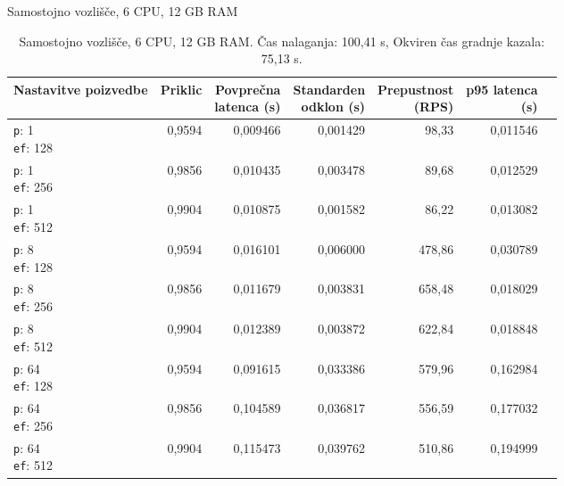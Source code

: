 \begin{table}[htbp]
  \centering
\small
  \caption{Samostojno vozlišče, 6 CPU, 12 GB RAM}
  \label{tab:cluster-2cpu-4ram:tenant:single-node-6cpu-12-ram:qdrant-dipl-sharding-1-shard-1-replica-tenant-m-16-ef-128-random-768-100-tenants-extended-upload-2026-08-17-17-16-14.json}
  \begin{tabularx}{\textwidth}{Xrrrrrr}
    \toprule
    Nastavitve poizvedbe & Priklic & \makecell{Povprečna\\latenca (s)} & \makecell{Standarden\\odklon (s)} & \makecell{Prepustnost\\(RPS)} & \makecell{p95 latenca\\(s)}  \\
    \midrule
    \makecell{\texttt{p}: 1\\\texttt{ef}: 128} & 0,9594 & 0,009466 & 0,001429 & 98,33 & 0,011546 \\
    \makecell{\texttt{p}: 1\\\texttt{ef}: 256} & 0,9856 & 0,010435 & 0,003478 & 89,68 & 0,012529 \\
    \makecell{\texttt{p}: 1\\\texttt{ef}: 512} & 0,9904 & 0,010875 & 0,001582 & 86,22 & 0,013082 \\
    \makecell{\texttt{p}: 8\\\texttt{ef}: 128} & 0,9594 & 0,016101 & 0,006000 & 478,86 & 0,030789 \\
    \makecell{\texttt{p}: 8\\\texttt{ef}: 256} & 0,9856 & 0,011679 & 0,003831 & 658,48 & 0,018029 \\
    \makecell{\texttt{p}: 8\\\texttt{ef}: 512} & 0,9904 & 0,012389 & 0,003872 & 622,84 & 0,018848 \\
    \makecell{\texttt{p}: 64\\\texttt{ef}: 128} & 0,9594 & 0,091615 & 0,033386 & 579,96 & 0,162984 \\
    \makecell{\texttt{p}: 64\\\texttt{ef}: 256} & 0,9856 & 0,104589 & 0,036817 & 556,59 & 0,177032 \\
    \makecell{\texttt{p}: 64\\\texttt{ef}: 512} & 0,9904 & 0,115473 & 0,039762 & 510,86 & 0,194999 \\
    \bottomrule
  \end{tabularx}
\caption* {Samostojno vozlišče, 6 CPU, 12 GB RAM. Čas nalaganja: 100,41 s, Okviren čas gradnje kazala: 75,13 s.}\end{table}

